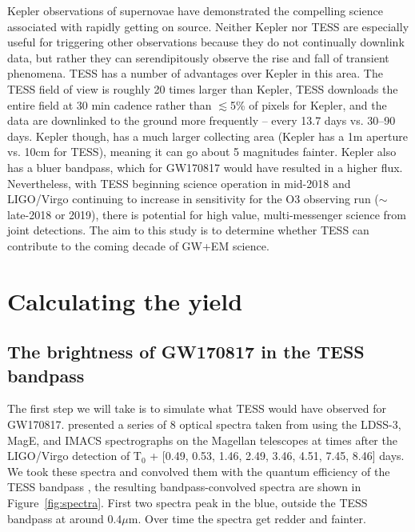 \documentclass[modern]{aastex61}
\begin{document}
Kepler observations of supernovae \citep{Olling2015,Garnavich2016} have demonstrated the compelling science associated with rapidly getting on source. Neither Kepler nor TESS are especially useful for triggering other observations because they do not continually downlink data, but rather they can serendipitously observe the rise and fall of transient phenomena. TESS has a number of advantages over Kepler in this area. The TESS field of view is roughly 20 times larger than Kepler, TESS downloads the entire field at 30 min cadence rather than $\lesssim$5\% of pixels for Kepler, and the data are downlinked to the ground more frequently -- every 13.7 days vs. 30--90 days. Kepler though, has a much larger collecting area (Kepler has a 1m aperture vs. 10cm for TESS), meaning it can go about 5 magnitudes fainter. Kepler also has a bluer bandpass, which for GW170817 would have resulted in a higher flux. Nevertheless, with TESS beginning science operation in mid-2018 and LIGO/Virgo continuing to increase in sensitivity for the O3 observing run ($\sim$ late-2018 or 2019), there is potential for high value, multi-messenger science from joint detections. The aim to this study is to determine whether TESS can contribute to the coming decade of GW+EM science. 

\section{Calculating the yield}
\subsection{The brightness of GW170817 in the TESS bandpass}
The first step we will take is to simulate what TESS would have observed for GW170817. \citet{Shappee2017} presented a series of 8 optical spectra taken from using the LDSS-3, MagE, and IMACS spectrographs on the Magellan telescopes at times after the LIGO/Virgo detection of T$_0$ + [0.49, 0.53, 1.46, 2.49, 3.46, 4.51, 7.45, 8.46] days. We took these spectra and convolved them with the quantum efficiency of the TESS bandpass \citep{Ricker2015}, the resulting bandpass-convolved spectra are shown in Figure~\ref{fig:spectra}. First two spectra peak in the blue, outside the TESS bandpass at around 0.4$\mu$m. Over time the spectra get redder and fainter.
\end{document}
